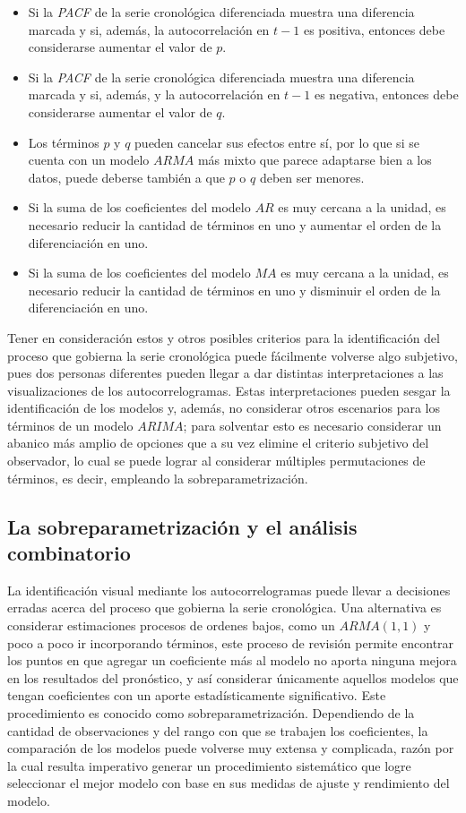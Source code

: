 \documentclass[
]{article}
\providecommand{\tightlist}{%
  \setlength{\itemsep}{0pt}\setlength{\parskip}{0pt}}
\begin{document}
\begin{itemize}
\tightlist
\item
  Si la \emph{PACF} de la serie cronológica diferenciada muestra una
  diferencia marcada y si, además, la autocorrelación en \(t-1\) es
  positiva, entonces debe considerarse aumentar el valor de \(p\).
\item
  Si la \emph{PACF} de la serie cronológica diferenciada muestra una
  diferencia marcada y si, además, y la autocorrelación en \(t-1\) es
  negativa, entonces debe considerarse aumentar el valor de \(q\).
\item
  Los términos \(p\) y \(q\) pueden cancelar sus efectos entre sí, por
  lo que si se cuenta con un modelo \(ARMA\) más mixto que parece
  adaptarse bien a los datos, puede deberse también a que \(p\) o \(q\)
  deben ser menores.
\item
  Si la suma de los coeficientes del modelo \(AR\) es muy cercana a la
  unidad, es necesario reducir la cantidad de términos en uno y aumentar
  el orden de la diferenciación en uno.
\item
  Si la suma de los coeficientes del modelo \(MA\) es muy cercana a la
  unidad, es necesario reducir la cantidad de términos en uno y
  disminuir el orden de la diferenciación en uno.
\end{itemize}

Tener en consideración estos y otros posibles criterios para la
identificación del proceso que gobierna la serie cronológica puede
fácilmente volverse algo subjetivo, pues dos personas diferentes pueden
llegar a dar distintas interpretaciones a las visualizaciones de los
autocorrelogramas. Estas interpretaciones pueden sesgar la
identificación de los modelos y, además, no considerar otros escenarios
para los términos de un modelo \(ARIMA\); para solventar esto es
necesario considerar un abanico más amplio de opciones que a su vez
elimine el criterio subjetivo del observador, lo cual se puede lograr al
considerar múltiples permutaciones de términos, es decir, empleando la
sobreparametrización.

\subsection{La sobreparametrización y el análisis combinatorio}

La identificación visual mediante los autocorrelogramas puede llevar a
decisiones erradas acerca del proceso que gobierna la serie cronológica.
Una alternativa es considerar estimaciones procesos de ordenes bajos,
como un \(ARMA(1,1)\) y poco a poco ir incorporando términos, este
proceso de revisión permite encontrar los puntos en que agregar un
coeficiente más al modelo no aporta ninguna mejora en los resultados del
pronóstico, y así considerar únicamente aquellos modelos que tengan
coeficientes con un aporte estadísticamente significativo. Este
procedimiento es conocido como sobreparametrización. Dependiendo de la
cantidad de observaciones y del rango con que se trabajen los
coeficientes, la comparación de los modelos puede volverse muy extensa y
complicada, razón por la cual resulta imperativo generar un
procedimiento sistemático que logre seleccionar el mejor modelo con base
en sus medidas de ajuste y rendimiento del modelo.
\end{document}
